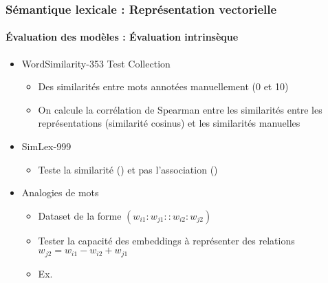 \documentclass[xcolor=table]{beamer}
\begin{document}
\begin{frame}
\frametitle{Sémantique lexicale : Représentation vectorielle}
\framesubtitle{Évaluation des modèles : Évaluation intrinsèque}

\begin{itemize}
	\item  WordSimilarity-353 Test Collection \cite{2002-finkelstein-al}
	\begin{itemize}
		\item Des similarités entre mots annotées manuellement (0 et 10)
		\item On calcule la corrélation de Spearman entre les similarités entre les représentations (similarité cosinus) et les similarités manuelles
	\end{itemize}
	
	\item SimLex-999 \cite{2015-hill-al}
	\begin{itemize}
		\item Teste la similarité () et pas l'association ()
	\end{itemize}

	\item Analogies de mots \cite{2013-mikolov-al2}
	\begin{itemize}
		\item Dataset de la forme $(w_{i1}:w_{j1} :: w_{i2}:w_{j2})$
		\item Tester la capacité des embeddings à représenter des relations $w_{j2} = w_{i1} - w_{i2} + w_{j1}$
		\item Ex. 
	\end{itemize}

\end{itemize}
	
\end{frame}
\end{document}
